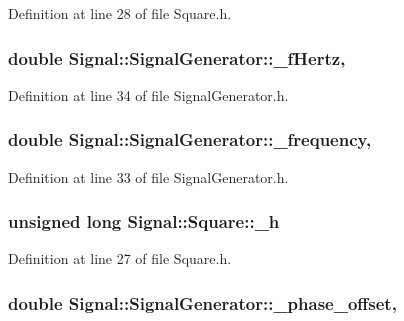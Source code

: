 Definition at line 28 of file Square.\+h.

\hypertarget{classSignal_1_1SignalGenerator_a85a4702347352bab1c71e0a8df8437d6}{
\subsubsection[{\+\_\+f\+Hertz}]{\setlength{\rightskip}{0pt plus 5cm}double Signal\+::\+Signal\+Generator\+::\+\_\+f\+Hertz\hspace{0.3cm}{\ttfamily [protected]}, {\ttfamily [inherited]}}}\label{classSignal_1_1SignalGenerator_a85a4702347352bab1c71e0a8df8437d6}


Definition at line 34 of file Signal\+Generator.\+h.

\hypertarget{classSignal_1_1SignalGenerator_a7f107461333bce68c5dad412db96a8c2}{
\subsubsection[{\+\_\+frequency}]{\setlength{\rightskip}{0pt plus 5cm}double Signal\+::\+Signal\+Generator\+::\+\_\+frequency\hspace{0.3cm}{\ttfamily [protected]}, {\ttfamily [inherited]}}}\label{classSignal_1_1SignalGenerator_a7f107461333bce68c5dad412db96a8c2}


Definition at line 33 of file Signal\+Generator.\+h.

\hypertarget{classSignal_1_1Square_a841e8057c59c3dd07ba672420a7fac4a}{
\subsubsection[{\+\_\+h}]{\setlength{\rightskip}{0pt plus 5cm}unsigned long Signal\+::\+Square\+::\+\_\+h\hspace{0.3cm}{\ttfamily [protected]}}}\label{classSignal_1_1Square_a841e8057c59c3dd07ba672420a7fac4a}


Definition at line 27 of file Square.\+h.

\hypertarget{classSignal_1_1SignalGenerator_a6b4444d46747c8517171edbbf4b5588f}{
\subsubsection[{\+\_\+phase\+\_\+offset}]{\setlength{\rightskip}{0pt plus 5cm}double Signal\+::\+Signal\+Generator\+::\+\_\+phase\+\_\+offset\hspace{0.3cm}{\ttfamily [protected]}, {\ttfamily [inherited]}}}\label{classSignal_1_1SignalGenerator_a6b4444d46747c8517171edbbf4b5588f}


